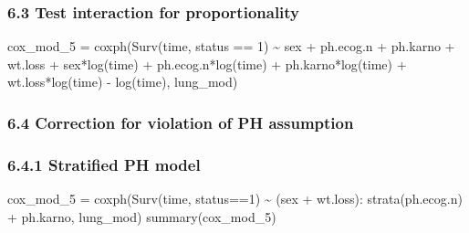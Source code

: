 \documentclass[
]{article}
\newenvironment{Shaded}{\begin{snugshade}}{\end{snugshade}}
\newcommand{\DecValTok}[1]{\textcolor[rgb]{0.00,0.00,0.81}{#1}}
\newcommand{\FunctionTok}[1]{\textcolor[rgb]{0.00,0.00,0.00}{#1}}
\newcommand{\NormalTok}[1]{#1}
\newcommand{\OtherTok}[1]{\textcolor[rgb]{0.56,0.35,0.01}{#1}}
\newcommand{\SpecialCharTok}[1]{\textcolor[rgb]{0.00,0.00,0.00}{#1}}
\begin{document}
\hypertarget{test-interaction-for-proportionality}{%
\subsubsection{6.3 Test interaction for
proportionality}\label{test-interaction-for-proportionality}}

\begin{Shaded}
\begin{Highlighting}[]
\NormalTok{cox\_mod\_5 }\OtherTok{=} \FunctionTok{coxph}\NormalTok{(}\FunctionTok{Surv}\NormalTok{(time, status }\SpecialCharTok{==} \DecValTok{1}\NormalTok{) }\SpecialCharTok{\textasciitilde{}}\NormalTok{ sex }\SpecialCharTok{+}\NormalTok{ ph.ecog.n }\SpecialCharTok{+}\NormalTok{ ph.karno }\SpecialCharTok{+}\NormalTok{ wt.loss }\SpecialCharTok{+}
\NormalTok{                  sex}\SpecialCharTok{*}\FunctionTok{log}\NormalTok{(time) }\SpecialCharTok{+}\NormalTok{ ph.ecog.n}\SpecialCharTok{*}\FunctionTok{log}\NormalTok{(time) }\SpecialCharTok{+}\NormalTok{ ph.karno}\SpecialCharTok{*}\FunctionTok{log}\NormalTok{(time)  }\SpecialCharTok{+}\NormalTok{ wt.loss}\SpecialCharTok{*}\FunctionTok{log}\NormalTok{(time) }
                  \SpecialCharTok{{-}} \FunctionTok{log}\NormalTok{(time), }
\NormalTok{                  lung\_mod) }
\end{Highlighting}
\end{Shaded}

\hypertarget{correction-for-violation-of-ph-assumption}{%
\subsubsection{6.4 Correction for violation of PH
assumption}\label{correction-for-violation-of-ph-assumption}}

\hypertarget{stratified-ph-model}{%
\subsubsection{6.4.1 Stratified PH model}\label{stratified-ph-model}}

\begin{Shaded}
\begin{Highlighting}[]
\NormalTok{cox\_mod\_5 }\OtherTok{=} \FunctionTok{coxph}\NormalTok{(}\FunctionTok{Surv}\NormalTok{(time, status}\SpecialCharTok{==}\DecValTok{1}\NormalTok{) }\SpecialCharTok{\textasciitilde{}}\NormalTok{ (sex }\SpecialCharTok{+}\NormalTok{ wt.loss)}\SpecialCharTok{:} \FunctionTok{strata}\NormalTok{(ph.ecog.n) }\SpecialCharTok{+}\NormalTok{ ph.karno, lung\_mod) }
\FunctionTok{summary}\NormalTok{(cox\_mod\_5)}
\end{Highlighting}
\end{Shaded}
\end{document}
